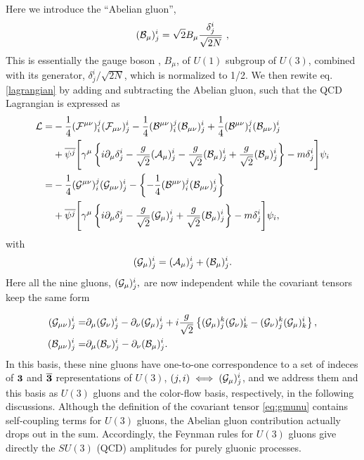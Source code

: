 \documentclass[a4paper,11pt]{article}
\begin{document}
Here we introduce the ``Abelian gluon'',
\begin{align}
 ({\cal B}_{\mu})^i_j=\sqrt{2}B_{\mu}\frac{\delta^i_j}{\sqrt{2N}}\,\,,
\end{align}
This is essentially the gauge boson , $B_{\mu}$, of $U(1)$ subgroup of $U(3)$, combined with its generator, $\delta^i_j/\sqrt{2N}$, which is normalized to 1/2.  We then rewite
eq.\eqref{lagrangian} by adding and subtracting the Abelian gluon,
such that the QCD Lagrangian is expressed as
\begin{align}
 {\cal L}=&-\frac{1}{4}({\cal F}^{\mu\nu})^j_i({\cal
 F}_{\mu\nu})^i_j
-\frac{1}{4}({\cal B}^{\mu\nu})^j_i({\cal
 B}_{\mu\nu})^i_j
+\frac{1}{4}({\cal B}^{\mu\nu})^j_i({\cal B}_{\mu\nu})^i_j\nonumber\\
&+\overline{\psi^j}\Biggl[\gamma^{\mu}\left\{i\partial_{\mu}\delta^i_j-\frac{g}
{\sqrt{2}}({\cal A}_{\mu})^i_j-\frac{g}{\sqrt{2}}({\cal
  B}_{\mu})^i_j+\frac{g}{\sqrt{2}}({\cal
  B}_{\mu})^i_j\right\}
-m\delta^i_j\Biggr]\psi_i\nonumber\\
=&-\frac{1}{4}({\cal G}^{\mu\nu})^j_i({\cal
 G}_{\mu\nu})^i_j
-\left\{-\frac{1}{4}({\cal B}^{\mu\nu})^j_i({\cal
 B}_{\mu\nu})^i_j\right\}\nonumber\\
&+\overline{\psi^j}\Biggl[\gamma^{\mu}\left\{i\partial_{\mu}\delta^i_j-\frac{g}
{\sqrt{2}}({\cal
  G}_{\mu})^i_j+\frac{g}{\sqrt{2}}({\cal
  B}_{\mu})^i_j\right\}-m\delta^i_j\Biggr]\psi_i
\label{eq:cflag},
\end{align}
with
\begin{align}
({\cal G}_{\mu})^i_j=({\cal A}_{\mu})^i_j+({\cal B}_{\mu})^i_j.
\end{align}
Here all the nine gluons, $({\cal G}_{\mu})^i_j,$ are now independent while the
 covariant tensors keep the same form

\begin{align}
({\cal G}_{\mu\nu})^i_j=&\partial_{\mu}({\cal G}_{\nu})^i_j
-\partial_{\nu}({\cal G}_{\mu})^i_j+i\frac{g}{\sqrt{2}}\left\{({\cal G}_{\mu})^k_j
({\cal G}_{\nu})^i_k-({\cal G}_{\nu})^k_j
({\cal G}_{\mu})^i_k\right\}\label{eq:gmunu},\\
({\cal B}_{\mu\nu})^i_j=&\partial_{\mu}({\cal B}_{\nu})^i_j
-\partial_{\nu}({\cal B}_{\mu})^i_j\label{eq:bmunu}.
\end{align}
 In this basis, these nine gluons have one-to-one correspondence to a set
of indeces of ${\bf 3}$
and ${\bf \overline{3}}$ representations of $U(3)$, $(j,i) \iff ({\cal G}_{\mu})^i_j$, and we address them and this basis as $U(3)$ gluons  and the color-flow basis, respectively, in the following discussions. Although the definition of the covariant tensor \eqref{eq:gmunu} contains self-coupling
 terms for $U(3)$ gluons, the Abelian gluon contribution actually drops out
 in the sum. Accordingly, the Feynman rules for $U(3)$ gluons give directly the $SU(3)$ (QCD) amplitudes for purely
 gluonic processes\cite{fabio}. 
\end{document}
